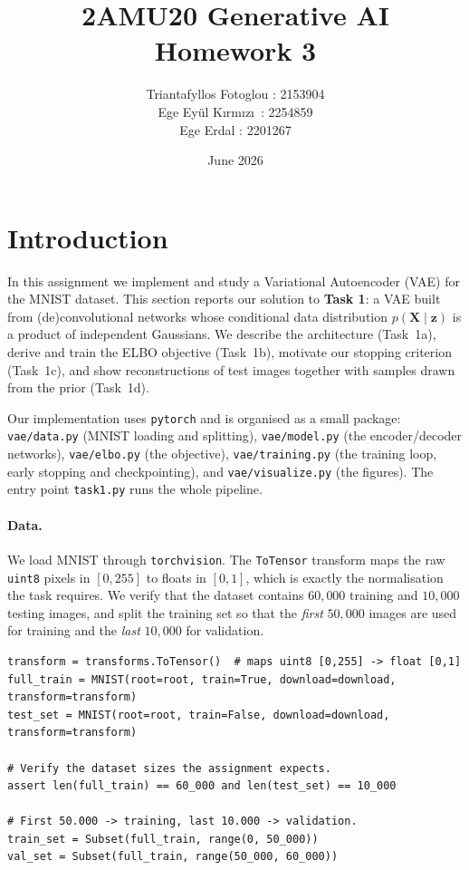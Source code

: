\documentclass{article}
\title{2AMU20 Generative AI \\ Homework 3}
\author{ Triantafyllos Fotoglou :  2153904\\ Ege Ey\"ul K\i rm\i z\i\ : 2254859 \\ Ege Erdal : 2201267\\}
\date{June 2026}
\newcommand{\bX}{\mathbf{X}}
\newcommand{\bz}{\mathbf{z}}
\begin{document}
\maketitle

\section{Introduction}

In this assignment we implement and study a Variational Autoencoder (VAE) for
the MNIST dataset. This section reports our solution to \textbf{Task 1}: a VAE
built from (de)convolutional networks whose conditional data distribution
$p(\bX \mid \bz)$ is a product of independent Gaussians. We describe the
architecture (Task~1a), derive and train the ELBO objective (Task~1b), motivate
our stopping criterion (Task~1c), and show reconstructions of test images
together with samples drawn from the prior (Task~1d).

Our implementation uses \texttt{pytorch} and is organised as a small package:
\texttt{vae/data.py} (MNIST loading and splitting), \texttt{vae/model.py} (the
encoder/decoder networks), \texttt{vae/elbo.py} (the objective),
\texttt{vae/training.py} (the training loop, early stopping and
checkpointing), and \texttt{vae/visualize.py} (the figures). The entry point
\texttt{task1.py} runs the whole pipeline.

\paragraph{Data.} We load MNIST through \texttt{torchvision}. The
\texttt{ToTensor} transform maps the raw \texttt{uint8} pixels in $[0,255]$ to
floats in $[0,1]$, which is exactly the normalisation the task requires. We
verify that the dataset contains $60{,}000$ training and $10{,}000$ testing
images, and split the training set so that the \emph{first} $50{,}000$ images
are used for training and the \emph{last} $10{,}000$ for validation.

\begin{lstlisting}[caption={Loading and splitting MNIST (\texttt{vae/data.py}).}]
transform = transforms.ToTensor()  # maps uint8 [0,255] -> float [0,1]
full_train = MNIST(root=root, train=True, download=download, transform=transform)
test_set = MNIST(root=root, train=False, download=download, transform=transform)

# Verify the dataset sizes the assignment expects.
assert len(full_train) == 60_000 and len(test_set) == 10_000

# First 50.000 -> training, last 10.000 -> validation.
train_set = Subset(full_train, range(0, 50_000))
val_set = Subset(full_train, range(50_000, 60_000))
\end{lstlisting}
\end{document}
